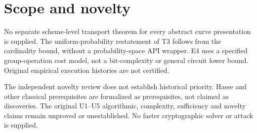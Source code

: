 \documentclass[11pt,a4paper]{article}
\begin{document}
\section*{Scope and novelty}
No separate scheme-level transport theorem for every abstract curve presentation is supplied. The uniform-probability restatement of T3 follows from the cardinality bound, without a probability-space API wrapper. E4 uses a specified group-operation cost model, not a bit-complexity or general circuit lower bound. Original empirical execution histories are not certified.

The independent novelty review does not establish historical priority. Hasse and other classical prerequisites are formalized as prerequisites, not claimed as discoveries. The original U1--U5 algorithmic, complexity, sufficiency and novelty claims remain unproved or unestablished. No faster cryptographic solver or attack is supplied.
\end{document}
